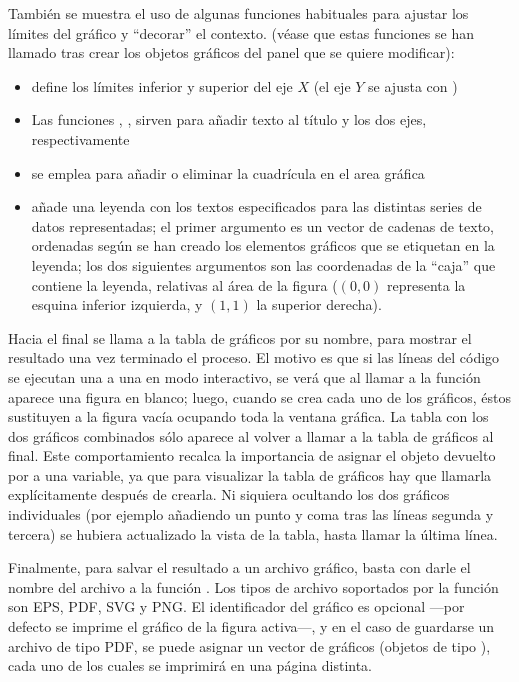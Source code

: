﻿\documentclass[spanish]{article}
\begin{document}
También se muestra el uso de algunas funciones habituales para ajustar los límites del gráfico y ``decorar'' el contexto. (véase que estas funciones se han llamado tras crear los objetos gráficos del panel que se quiere modificar):


\begin{itemize}
  \item {} define los límites inferior y superior del eje $X$ (el eje $Y$ se ajusta con )
  \item Las funciones , ,  sirven para añadir texto al título y los dos ejes, respectivamente
  \item {} se emplea para añadir o eliminar la cuadrícula en el area gráfica
  \item {} añade una leyenda con los textos especificados para las distintas series de datos representadas; el primer argumento es un vector de cadenas de texto, ordenadas según se han creado los elementos gráficos que se etiquetan en la leyenda; los dos siguientes argumentos son las coordenadas de la ``caja'' que contiene la leyenda, relativas al área de la figura ($(0,0)$ representa la esquina inferior izquierda, y $(1,1)$ la superior derecha).
\end{itemize}

Hacia el final se llama a la tabla de gráficos por su nombre, para mostrar el resultado una vez terminado el proceso. El motivo es que si las líneas del código se ejecutan una a una en modo interactivo, se verá que al llamar a la función  aparece una figura en blanco; luego, cuando se crea cada uno de los gráficos, éstos sustituyen a la figura vacía ocupando toda la ventana gráfica. La tabla con los dos gráficos combinados sólo aparece al volver a llamar a la tabla de gráficos al final. Este comportamiento recalca la importancia de asignar el objeto devuelto por  a una variable, ya que para visualizar la tabla de gráficos hay que llamarla explícitamente después de crearla. Ni siquiera ocultando los dos gráficos individuales (por ejemplo añadiendo un punto y coma tras las líneas segunda y tercera) se hubiera actualizado la vista de la tabla, hasta llamar la última línea.

Finalmente, para salvar el resultado a un archivo gráfico, basta con darle el nombre del archivo a la función . Los tipos de archivo soportados por la función son EPS, PDF, SVG y PNG. El identificador del gráfico es opcional ---por defecto se imprime el gráfico de la figura activa---, y en el caso de guardarse un archivo de tipo PDF, se puede asignar un vector de gráficos (objetos de tipo ), cada uno de los cuales se imprimirá en una página distinta.
\end{document}
